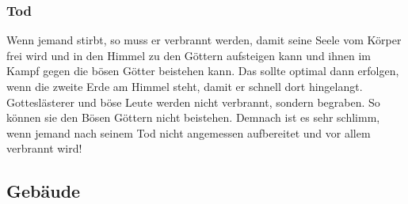 \subsubsection{Tod}
Wenn jemand stirbt, so muss er verbrannt werden, damit seine Seele vom Körper frei wird und in den Himmel zu den Göttern aufsteigen kann und ihnen im Kampf gegen die bösen Götter beistehen kann. 
Das sollte optimal dann erfolgen, wenn die zweite Erde am Himmel steht, damit er schnell dort hingelangt. 
Gotteslästerer und böse Leute werden nicht verbrannt, sondern begraben. 
So können sie den Bösen Göttern nicht beistehen.
Demnach ist es sehr schlimm, wenn jemand nach seinem Tod nicht angemessen aufbereitet und vor allem verbrannt wird!

\subsection{Gebäude}
